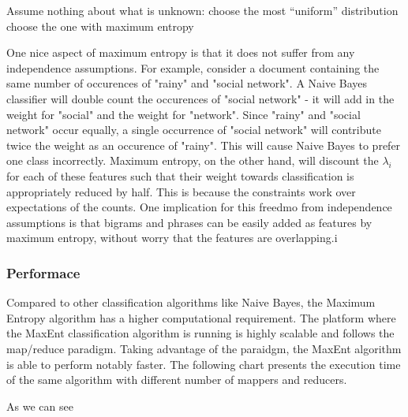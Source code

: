 Assume nothing about what is unknown: 
   choose the most “uniform” distribution 
   choose the one with maximum entropy

One nice aspect of maximum entropy is that it does not suffer from any independence assumptions. For example, consider a document containing the same number of occurences of
"rainy" and "social network". A Naive Bayes classifier will double count the occurences of "social network" - it will add in the weight for "social" and the weight for "network". Since "rainy" and
"social network" occur equally, a single occurrence of "social network" will contribute twice the weight as an occurence of "rainy". This will cause Naive Bayes to prefer one class incorrectly.
Maximum entropy, on the other hand, will discount the $\lambda_i$ for each of these features such that their weight towards classification is appropriately reduced by half.
This is because the constraints work over expectations of the counts. One implication for this freedmo from independence assumptions is that bigrams and phrases can be easily added as features 
by maximum entropy, without worry that the features are overlapping.i





\subsubsection{Performace}
Compared to other classification algorithms like Naive Bayes, the Maximum Entropy algorithm has a higher computational requirement. 
The platform where the MaxEnt classification algorithm is running is highly scalable and follows the map/reduce paradigm. Taking advantage of the paraidgm, the MaxEnt algorithm
is able to perform notably faster.
The following chart presents the execution time of the same algorithm with different number of mappers and reducers.



As we can see


